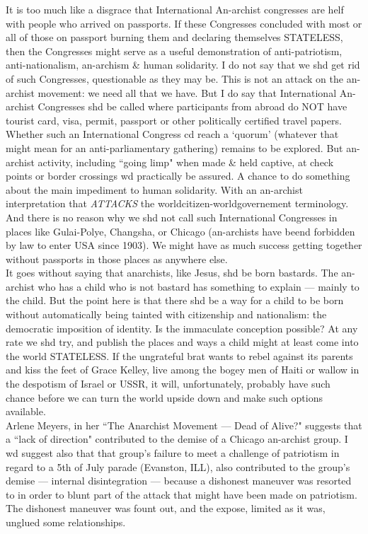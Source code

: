 \documentclass[12pt, onecolumn, letterpaper, oneside]{book}
\begin{document}
It is too much like a disgrace that International An-archist congresses are helf with people who arrived on passports. If these Congresses concluded with most or all of those on passport burning them and declaring themselves STATELESS, then the Congresses might serve as a useful demonstration of anti-patriotism, anti-nationalism, an-archism \& human solidarity. I do not say that we shd get rid of such Congresses, questionable as they may be. This is not an attack on the an-archist movement: we need all that we have. But I do say that International An-archist Congresses shd be called where participants from abroad do NOT have tourist card, visa, permit, passport or other politically certified travel papers. Whether such an International Congress cd reach a `quorum' (whatever that might mean for an anti-parliamentary gathering) remains to be explored. But an-archist activity, including ``going limp" when made \& held captive, at check points or border crossings wd practically be assured. A chance to do something about the main impediment to human solidarity. With an an-archist interpretation that \emph{ATTACKS} the worldcitizen-worldgovernement terminology.\\
And there is no reason why we shd not call such International Congresses in places like Gulai-Polye, Changsha, or Chicago (an-archists have beend forbidden by law to enter USA since 1903). We might have as much success getting together without passports in those places as anywhere else.\\
It goes without saying that anarchists, like Jesus, shd be born bastards. The an-archist who has a child who is not bastard has something to explain --- mainly to the child. But the point here is that there shd be a way for a child to be born without automatically  being tainted with citizenship and nationalism: the democratic imposition of identity. Is the immaculate conception possible? At any rate we shd try, and publish the places and ways a child might at least come into the world STATELESS. If the ungrateful brat wants to rebel against its parents and kiss the feet of Grace Kelley, live among the bogey men of Haiti or wallow in the despotism of Israel or USSR, it will, unfortunately, probably have such chance before we can turn the world upside down and make such options available.\\
Arlene Meyers, in her ``The Anarchist Movement --- Dead of Alive?" suggests that a ``lack of direction" contributed to the demise of a Chicago an-archist group. I wd suggest also that that group's failure to meet a challenge of patriotism in regard to a 5th of July parade (Evanston, ILL), also contributed to the group's demise --- internal disintegration --- because a dishonest maneuver was resorted to in order to blunt part of the attack that might have been made on patriotism. The dishonest maneuver was fount out, and the expose, limited as it was, unglued some relationships.\\
\end{document}
